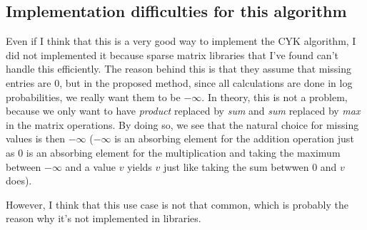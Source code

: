 \documentclass[a4paper, 11pt]{article}
\DeclareMathOperator*{\argmax}{arg\,max}
\DeclareMathOperator*{\argandmax}{arg/max}
\begin{document}





\subsection{Implementation difficulties for this algorithm}

Even if I think that this is a very good way to implement the CYK
algorithm, I did not implemented it because sparse matrix libraries
that I've found can't handle this efficiently. The reason behind this
is that they assume that missing entries are 0, but in the proposed
method, since all calculations are done in log probabilities, we
really want them to be $- \infty$. In theory, this is not a problem,
because we only want to have \emph{product} replaced by \emph{sum} and
\emph{sum} replaced by \emph{max} in the matrix operations. By doing
so, we see that the natural choice for missing values is then
$-\infty$ ($-\infty$ is an absorbing element for the addition
operation just as $0$ is an absorbing element for the multiplication
and taking the maximum between $-\infty$ and a value $v$ yields $v$
just like taking the sum betwwen $0$ and $v$ does).

However, I think that this use case is not that common, which is
probably the reason why it's not implemented in libraries.

\end{document}
